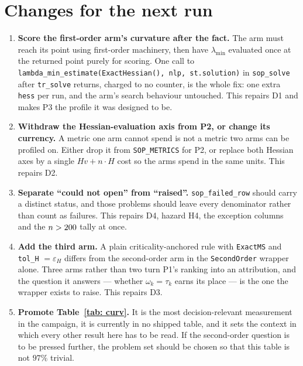 \documentclass[11pt,a4paper]{article}
\theoremstyle{remark}
\begin{document}
\section{Changes for the next run}\label{sec: next}

\begin{enumerate}[leftmargin=1.8em]
  \item \textbf{Score the first-order arm's curvature after the fact.} The arm
    must reach its point using first-order machinery, then have $\lambda_{\min}$
    evaluated once at the returned point purely for scoring. One call to
    \texttt{lambda\_min\_estimate(ExactHessian(), nlp, st.solution)} in
    \texttt{sop\_solve} after \texttt{tr\_solve} returns, charged to no counter,
    is the whole fix: one extra \texttt{hess} per run, and the arm's search
    behaviour untouched. This repairs D1 and makes P3 the profile it was designed
    to be.
  \item \textbf{Withdraw the Hessian-evaluation axis from P2, or change its
    currency.} A metric one arm cannot spend is not a metric two arms can be
    profiled on. Either drop it from \texttt{SOP\_METRICS} for P2, or replace both
    Hessian axes by a single $Hv + n \cdot H$ cost so the arms spend in the same
    units. This repairs D2.
  \item \textbf{Separate ``could not open'' from ``raised''.}
    \texttt{sop\_failed\_row} should carry a distinct status, and those problems
    should leave every denominator rather than count as failures. This repairs D4,
    hazard H4, the exception columns and the $n > 200{}$ tally at once.
  \item \textbf{Add the third arm.} A plain criticality-anchored rule with
    \texttt{ExactMS} and \texttt{tol\_H} $= \varepsilon_H$ differs from the
    second-order arm in the \texttt{SecondOrder} wrapper alone. Three arms rather
    than two turn P1's ranking into an attribution, and the question it answers
    --- whether $\omega_k = \tau_k$ earns its place --- is the one the wrapper
    exists to raise. This repairs D3.
  \item \textbf{Promote Table~\ref{tab: curv}.} It is the most decision-relevant
    measurement in the campaign, it is currently in no shipped table, and it sets
    the context in which every other result here has to be read. If the
    second-order question is to be pressed further, the problem set should be
    chosen so that this table is not $97\%$ trivial.
\end{enumerate}
\end{document}
